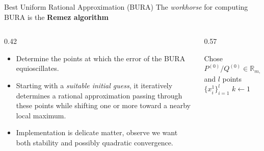 \documentclass[aspectratio=169,xcolor=dvipsnames]{beamer}
\begin{document}
	\begin{frame}{Best Uniform Rational Approximation (BURA)}
	The \emph{workhorse} for computing BURA is the \textbf{Remez algorithm} \parencite[\S\ 6.B]{MR866667}
	\begin{columns}
	\begin{column}{0.42\columnwidth}
	\begin{itemize}
		\item[\faLightbulb] Determine the points at which the error of the BURA equioscillates.
		\item[\faHammer] Starting with a \emph{suitable initial guess}, it iteratively determines a rational approximation passing through these points while shifting one or more toward a nearby local maximum. 
		\item[\faMagic] Implementation is \alert{delicate matter}, observe we want both stability and possibly quadratic convergence.
	\end{itemize}
	\end{column}
	\begin{column}{0.57\columnwidth}\small
	\begin{algorithm}[H]
	Chose $P^{(0)}/Q^{(0)} \in \mathbb{R}_{m,n}$ and $l$ points $\{x_i^1\}_{i=1}^l$\;
	$k \gets 1$\;
	\end{algorithm}
	\end{column}
	\end{columns}
	\end{frame}
\end{document}
